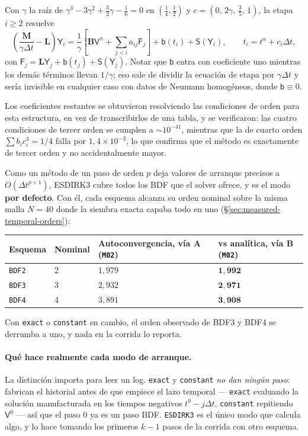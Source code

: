 \documentclass[11pt,a4paper]{article}
\newcommand{\code}[1]{\texttt{\small #1}}
\newcommand{\Mmass}{\mathbf{M}}
\newcommand{\Lop}{\mathbf{L}}
\newcommand{\Bimp}{\mathbf{B}}
\begin{document}
Con $\gamma$ la raíz de $\gamma^3-3\gamma^2+\tfrac32\gamma-\tfrac16=0$ en
$(\tfrac14,\tfrac12)$ y $c=(0,\,2\gamma,\,\tfrac35,\,1)$, la etapa $i\ge2$ resuelve
\begin{equation}
  \left(\frac{\Mmass}{\gamma\Delta t}-\Lop\right)\mathsf{Y}_i
  =
  \frac{1}{\gamma}\left[\Bimp\mathsf{V}^{n}
  +\sum_{j<i}a_{ij}\mathsf{F}_j\right]
  +\mathsf{b}(t_i)+\mathsf{S}(\mathsf{Y}_i),
  \qquad
  t_i=t^n+c_i\Delta t,
  \label{eq:esdirk-stage}
\end{equation}
con $\mathsf{F}_j=\Lop\mathsf{Y}_j+\mathsf{b}(t_j)+\mathsf{S}(\mathsf{Y}_j)$. Notar que
$\mathsf{b}$ entra con coeficiente uno mientras los demás términos llevan $1/\gamma$; eso
sale de dividir la ecuación de etapa por $\gamma\Delta t$ y sería invisible en cualquier
caso con datos de Neumann homogéneos, donde $\mathsf{b}\equiv0$.

Los coeficientes restantes se obtuvieron resolviendo las condiciones de orden para esta
estructura, en vez de transcribirlos de una tabla, y se verificaron: las cuatro condiciones
de tercer orden se cumplen a $\sim10^{-41}$, mientras que la de cuarto orden
$\sum b_ic_i^3=1/4$ falla por $1{,}4\times10^{-3}$, lo que confirma que el método es
exactamente de tercer orden y no accidentalmente mayor.

Como un método de un paso de orden $p$ deja valores de arranque precisos a
$O(\Delta t^{p+1})$, ESDIRK3 cubre todos los BDF que el solver ofrece, y es el modo
\textbf{por defecto}. Con él, cada esquema alcanza su orden nominal sobre la misma malla
$N=40$ donde la siembra exacta capaba todo en uno
(\S\ref{sec:measured-temporal-orders}):
\begin{center}
\begin{tabular}{@{}llll@{}}
\toprule
Esquema & Nominal & Autoconvergencia, vía A (\code{M02}) & vs analítica, vía B (\code{M02}) \\
\midrule
\code{BDF2} & 2 & $1{,}979$ & $\mathbf{1{,}992}$ \\
\code{BDF3} & 3 & $2{,}932$ & $\mathbf{2{,}971}$ \\
\code{BDF4} & 4 & $3{,}891$ & $\mathbf{3{,}908}$ \\
\bottomrule
\end{tabular}
\end{center}
Con \code{exact} o \code{constant} en cambio, el orden observado de BDF3 y BDF4 se derrumba
a uno, y nada en la corrida lo reporta.

\paragraph{Qué hace realmente cada modo de arranque.} La distinción importa para leer un
log. \code{exact} y \code{constant} \emph{no dan ningún paso}: fabrican el historial antes
de que empiece el lazo temporal --- \code{exact} evaluando la solución manufacturada en los
tiempos negativos $t^0-j\Delta t$, \code{constant} repitiendo $\mathsf{V}^0$ --- así que el
paso $0$ ya es un paso BDF. \code{ESDIRK3} es el único modo que calcula algo, y lo hace
tomando los primeros $k-1$ pasos de la corrida con otro esquema.
\end{document}

